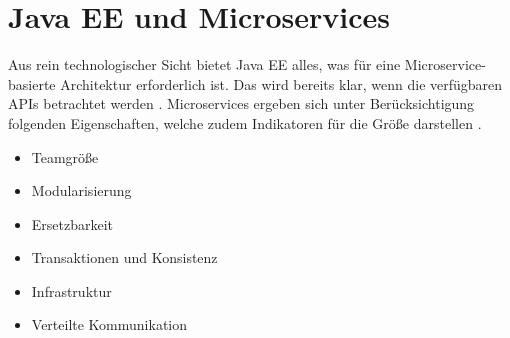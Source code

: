 \section{Java EE und Microservices}
Aus rein technologischer Sicht bietet Java EE alles, was für eine Microservice-basierte Architektur erforderlich ist. Das wird bereits klar, wenn die verfügbaren APIs betrachtet werden \cite{jaxcenter.2016}. Microservices ergeben sich unter Berücksichtigung folgenden Eigenschaften, welche zudem Indikatoren für die Größe darstellen \cite{EberhardWolff.2015}.
\begin{itemize}
	\item Teamgröße
	\item Modularisierung
	\item Ersetzbarkeit
	\item Transaktionen und Konsistenz
	\item Infrastruktur
	\item Verteilte Kommunikation	
\end{itemize}

